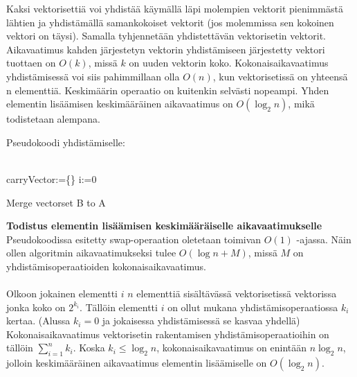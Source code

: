 \documentclass{article}
\begin{document}
    Kaksi vektorisettiä voi yhdistää käymällä läpi molempien vektorit pienimmästä lähtien ja yhdistämällä samankokoiset vektorit 
    (jos molemmissa sen kokoinen vektori on täysi). Samalla tyhjennetään yhdistettävän vektorisetin vektorit. Aikavaatimus kahden 
    järjestetyn vektorin yhdistämiseen järjestetty vektori tuottaen on $O(k)$, missä $k$ on uuden vektorin koko. Kokonaisaikavaatimus
    yhdistämisessä voi siis pahimmillaan olla $O(n)$, kun vektorisetissä on yhteensä n elementtiä. Keskimäärin operaatio on kuitenkin
    selvästi nopeampi. Yhden elementin lisäämisen keskimääräinen aikavaatimus on $O(\log_2 n)$, mikä todistetaan alempana.
    
    Pseudokoodi yhdistämiselle:
    \\ \\
    \begin{algorithm}[H]
        carryVector:=\{\}\;
        i:=0\;
        \caption{Merge vectorset B to A}
    \end{algorithm}
    
    \medskip \medskip
    \textbf{Todistus elementin lisäämisen keskimääräiselle aikavaatimukselle}
    Pseudokoodissa esitetty swap-operaation oletetaan toimivan $O(1)$ -ajassa. Näin ollen algoritmin aikavaatimukseksi tulee
    $O(\log n + M)$, missä $M$ on yhdistämisoperaatioiden kokonaisaikavaatimus.
    \\ \\
    Olkoon jokainen elementti $i$ $n$ elementtiä sisältävässä vektorisetissä vektorissa jonka koko on $2^{k_i}$. Tällöin
    elementti $i$ on ollut mukana yhdistämisoperaatiossa $k_i$ kertaa. (Alussa $k_i=0$ ja jokaisessa yhdistämisessä 
    se kasvaa yhdellä) Kokonaisaikavaatimus vektorisetin rakentamisen yhdistämisoperaatioihin on tällöin $\sum_{i=1}^n{k_i}$. 
    Koska $k_i\leq \log_2n$, kokonaisaikavaatimus on enintään $n\log_2n$, jolloin keskimääräinen aikavaatimus elementin 
    lisäämiselle on $O(\log_2 n)$.
\end{document}
